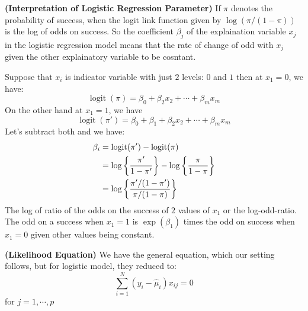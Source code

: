 \begin{remark}{\textbf{(Interpretation of Logistic Regression Parameter)}}
    If $\pi$ denotes the probability of success, when the logit link function given by $\log(\pi/(1-\pi))$ is the log of odds on success. So the coefficient $\beta_j$ of the explaination variable $x_j$ in the logistic regression model means that the rate of change of odd with $x_j$ given the other explainatory variable to be cosntant. 
\end{remark}

\begin{remark}
    Suppose that $x_i$ is indicator variable with just $2$ levels: $0$ and $1$ then at $x_1 = 0$, we have:
    \begin{equation*}
        \operatorname{logit}(\pi) = \beta_0 + \beta_2x_2 + \cdots + \beta_mx_m
    \end{equation*}
    On the other hand at $x_1 = 1$, we have
    \begin{equation*}
        \operatorname{logit}(\pi') = \beta_0 + \beta_1 + \beta_2x_2 + \cdots + \beta_mx_m
    \end{equation*}
    Let's subtract both and we have:
    \begin{equation*}
    \begin{aligned}
        \beta_i &= \operatorname{logit}(\pi') - \operatorname{logit}(\pi) \\
        &= \log\left\{ \frac{\pi'}{1-\pi'} \right\} - \log\left\{ \frac{\pi}{1-\pi} \right\} \\
        &= \log\left\{ \frac{\pi'/(1-\pi')}{\pi/(1-\pi)} \right\}
    \end{aligned}
    \end{equation*}
    The log of ratio of the odds on the success of $2$ values of $x_1$ or the log-odd-ratio. The odd on a success when $x_1=1$ is $\exp(\beta_1)$ times the odd on success when $x_1=0$ given other values being constant. 
\end{remark}

\begin{remark}{\textbf{(Likelihood Equation)}}
    We have the general equation, which our setting follows, but for logistic model, they reduced to:
    \begin{equation*}
        \sum^N_{i=1}(y_i - \hat{\mu}_i)x_{ij} = 0
    \end{equation*}
    for $j=1,\cdots,p$
\end{remark}

